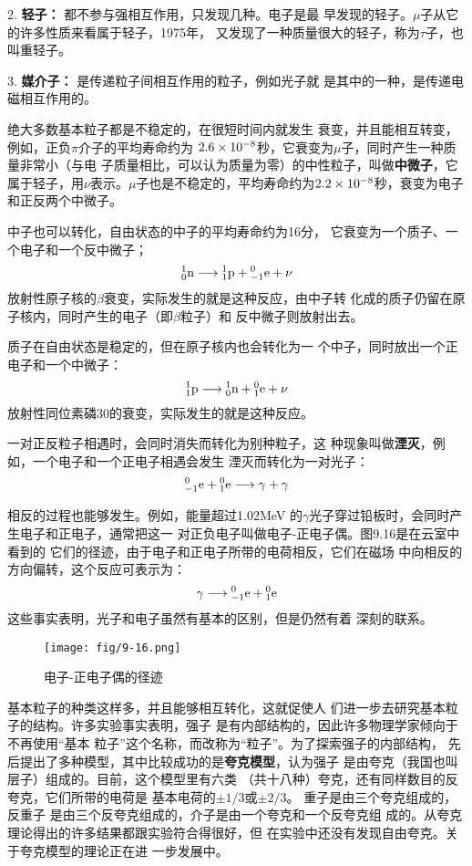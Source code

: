 2. \textbf{轻子：} 都不参与强相互作用，只发现几种。电子是最
早发现的轻子。$\mu$子从它的许多性质来看属于轻子，1975年，
又发现了一种质量很大的轻子，称为$\tau$子，也叫重轻子。

3. \textbf{媒介子：} 是传递粒子间相互作用的粒子，例如光子就
是其中的一种，是传递电磁相互作用的。

绝大多数基本粒子都是不稳定的，在很短时间内就发生
衰变，并且能相互转变，例如，正负$\pi$介子的平均寿命约为
$2.6\x10^{-8}$秒，它衰变为$\mu$子，同时产生一种质量非常小（与电
子质量相比，可以认为质量为零）的中性粒子，叫做\textbf{中微子}，它
属于轻子，用$\nu$表示。$\mu$子也是不稳定的，平均寿命约为$2.2\x
10^{-8}$秒，衰变为电子和正反两个中微子。

中子也可以转化，自由状态的中子的平均寿命约为16分，
它衰变为一个质子、一个电子和一个反中微子；
\[\atom{n}{1}{0}\longrightarrow \atom{p}{1}{1}+\atom{e}{0}{-1}+\nu   \]
放射性原子核的$\beta$衰变，实际发生的就是这种反应，由中子转
化成的质子仍留在原子核内，同时产生的电子（即$\beta$粒子）和
反中微子则放射出去。

质子在自由状态是稳定的，但在原子核内也会转化为一
个中子，同时放出一个正电子和一个中微子：
\[\atom{p}{1}{1}\longrightarrow \atom{n}{1}{0}+\atom{e}{0}{1}+\nu   \]
放射性同位素磷30的衰变，实际发生的就是这种反应。

一对正反粒子相遇时，会同时消失而转化为别种粒子，这
种现象叫做\textbf{湮灭}，例如，一个电子和一个正电子相遇会发生
湮灭而转化为一对光子：
\[\atom{e}{0}{-1}+\atom{e}{0}{1}\longrightarrow \gamma+\gamma  \]

相反的过程也能够发生。例如，能量超过1.02MeV
的$\gamma$光子穿过铅板时，会同时产生电子和正电子，通常把这一
对正负电子叫做电子-正电子偶。图9.16是在云室中看到的
它们的径迹，由于电子和正电子所带的电荷相反，它们在磁场
中向相反的方向偏转，这个反应可表示为：
\[\gamma\longrightarrow \atom{e}{0}{-1}+\atom{e}{0}{1} \]
这些事实表明，光子和电子虽然有基本的区别，但是仍然有着
深刻的联系。
\begin{figure}[htp]\centering
\texttt{[image: fig/9-16.png]}
\caption{电子-正电子偶的径迹}
\end{figure}



基本粒子的种类这样多，并且能够相互转化，这就促使人
们进一步去研究基本粒子的结构。许多实验事实表明，强子
是有内部结构的，因此许多物理学家倾向于不再使用“基本
粒子”这个名称，而改称为“粒子”。为了探索强子的内部结构，
先后提出了多种模型，其中比较成功的是\textbf{夸克模型}，认为强子
是由夸克（我国也叫层子）组成的。目前，这个模型里有六类
（共十八种）夸克，还有同样数目的反夸克，它们所带的电荷是
基本电荷的$\pm1/3$或$\pm 2/3$。
重子是由三个夸克组成的，反重子
是由三个反夸克组成的，介子是由一个夸克和一个反夸克组
成的。从夸克理论得出的许多结果都跟实验符合得很好，但
在实验中还没有发现自由夸克。关于夸克模型的理论正在进
一步发展中。

